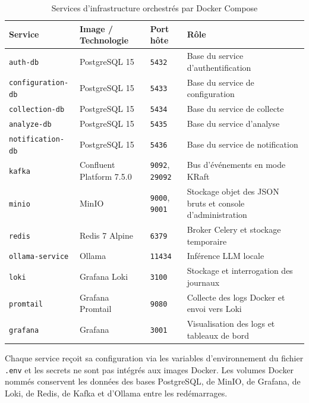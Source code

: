 \begin{table}[H]
\centering
\scriptsize
\caption{Services d'infrastructure orchestrés par Docker Compose}
\label{tab:docker-services-infra}
\begin{tabular}{|>{\raggedright\arraybackslash}p{3.2cm}
                |>{\raggedright\arraybackslash}p{3.3cm}
                |>{\raggedright\arraybackslash}p{2cm}
                |>{\raggedright\arraybackslash}p{4.4cm}|}
\hline
\textbf{Service} & \textbf{Image / Technologie} & \textbf{Port hôte} & \textbf{Rôle} \\
\hline
\texttt{auth-db} & PostgreSQL 15 & \texttt{5432} & Base du service d'authentification \\
\hline
\texttt{configuration-db} & PostgreSQL 15 & \texttt{5433} & Base du service de configuration \\
\hline
\texttt{collection-db} & PostgreSQL 15 & \texttt{5434} & Base du service de collecte \\
\hline
\texttt{analyze-db} & PostgreSQL 15 & \texttt{5435} & Base du service d'analyse \\
\hline
\texttt{notification-db} & PostgreSQL 15 & \texttt{5436} & Base du service de notification \\
\hline
\texttt{kafka} & Confluent Platform 7.5.0 & \texttt{9092}, \texttt{29092} & Bus d'événements en mode KRaft \\
\hline
\texttt{minio} & MinIO & \texttt{9000}, \texttt{9001} & Stockage objet des JSON bruts et console d'administration \\
\hline
\texttt{redis} & Redis 7 Alpine & \texttt{6379} & Broker Celery et stockage temporaire \\
\hline
\texttt{ollama-service} & Ollama & \texttt{11434} & Inférence LLM locale \\
\hline
\texttt{loki} & Grafana Loki & \texttt{3100} & Stockage et interrogation des journaux \\
\hline
\texttt{promtail} & Grafana Promtail & \texttt{9080} & Collecte des logs Docker et envoi vers Loki \\
\hline
\texttt{grafana} & Grafana & \texttt{3001} & Visualisation des logs et tableaux de bord \\
\hline
\end{tabular}
\end{table}

Chaque service reçoit sa configuration via les variables d'environnement du fichier \texttt{.env}
et les secrets ne sont pas intégrés aux images Docker. Les volumes Docker nommés conservent les
données des bases PostgreSQL, de MinIO, de Grafana, de Loki, de Redis, de Kafka et d'Ollama entre
les redémarrages.

